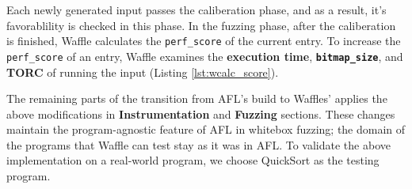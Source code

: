 

Each newly generated input passes the caliberation phase, and as a result, it's favorablility is checked in this phase. In the fuzzing phase, after the caliberation is finished, Waffle calculates the \texttt{perf\_score} of the current entry. To increase the \texttt{perf\_score} of an entry, Waffle examines the \textbf{execution time}, \textbf{\texttt{bitmap\_size}}, and \textbf{TORC} of running the input (Listing \ref{lst:wcalc_score}).



The remaining parts of the transition from AFL's build to Waffles' applies the above modifications in \textbf{Instrumentation} and \textbf{Fuzzing} sections. These changes maintain the program-agnostic feature of AFL in whitebox fuzzing; the domain of the programs that Waffle can test stay as it was in AFL. To validate the above implementation on a real-world program, we choose QuickSort as the testing program.